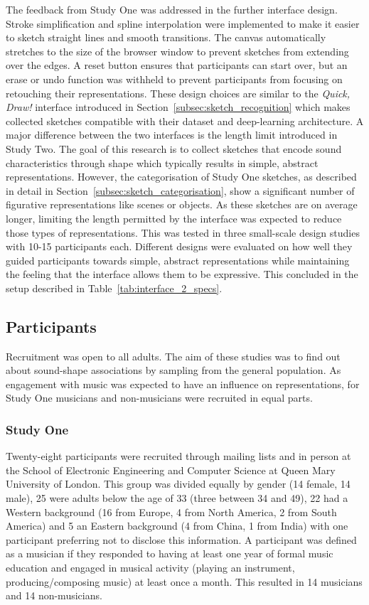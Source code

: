 \documentclass[]{interact}
\theoremstyle{plain}%
\theoremstyle{definition}
\theoremstyle{remark}
\begin{document}
The feedback from Study One was addressed in the further interface design. Stroke simplification and spline interpolation were implemented to make it easier to sketch straight lines and smooth transitions. The canvas automatically stretches to the size of the browser window to prevent sketches from extending over the edges. A reset button ensures that participants can start over, but an erase or undo function was withheld to prevent participants from focusing on retouching their representations. These design choices are similar to the \textit{Quick, Draw!} interface introduced in Section~\ref{subsec:sketch_recognition} which makes collected sketches compatible with their dataset and deep-learning architecture. A major difference between the two interfaces is the length limit introduced in Study Two. The goal of this research is to collect sketches that encode sound characteristics through shape which typically results in simple, abstract representations. However, the categorisation of Study One sketches, as described in detail in Section~\ref{subsec:sketch_categorisation}, show a significant number of figurative representations like scenes or objects. As these sketches are on average longer, limiting the length permitted by the interface was expected to reduce those types of representations. This was tested in three small-scale design studies with 10-15 participants each. Different designs were evaluated on how well they guided participants towards simple, abstract representations while maintaining the feeling that the interface allows them to be expressive. This concluded in the setup described in Table~\ref{tab:interface_2_specs}.

\subsection{Participants}\label{subsec:participants}
Recruitment was open to all adults. The aim of these studies was to find out about sound-shape associations by sampling from the general population. As engagement with music was expected to have an influence on representations, for Study One musicians and non-musicians were recruited in equal parts.  

\subsubsection{Study One}\label{subsubsec:participants_one}
Twenty-eight participants were recruited through mailing lists and in person at the School of Electronic Engineering and Computer Science at Queen Mary University of London. This group was divided equally by gender (14 female, 14 male), 25 were adults below the age of 33 (three between 34 and 49), 22 had a Western background (16 from Europe, 4 from North America, 2 from South America) and 5 an Eastern background (4 from China, 1 from India) with one participant preferring not to disclose this information. A participant was defined as a musician if they responded to having at least one year of formal music education and engaged in musical activity (playing an instrument, producing/composing music) at least once a month. This resulted in 14 musicians and 14 non-musicians.
\end{document}
